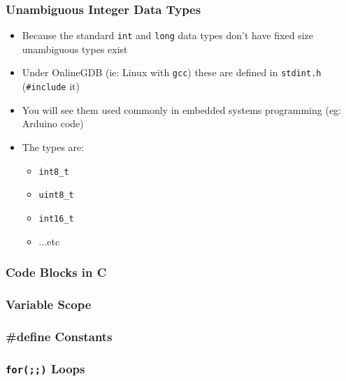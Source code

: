 \documentclass[14pt]{beamer}
\begin{document}
\begin{frame}
\frametitle{Unambiguous Integer Data Types}
\begin{itemize}
\item Because the standard \texttt{int} and \texttt{long} data types don't have fixed size unambiguous types exist
\item Under OnlineGDB (ie: Linux with \texttt{gcc}) these are defined in \texttt{stdint.h} (\texttt{\#include} it)
\item You will see them used commonly in embedded systems programming (eg: Arduino code)
\item The types are:
	\begin{itemize}
		\item \texttt{int8\_t}
		\item \texttt{uint8\_t}
		\item \texttt{int16\_t}
		\item ...etc
	\end{itemize}
\end{itemize}
\end{frame}

\begin{frame}
\frametitle{Code Blocks in C}
\end{frame}

\begin{frame}
\frametitle{Variable Scope}
\end{frame}

\begin{frame}
\frametitle{\#define Constants}
\end{frame}

\begin{frame}
\frametitle{\texttt{for(;;)} Loops}
\end{frame}
\end{document}

